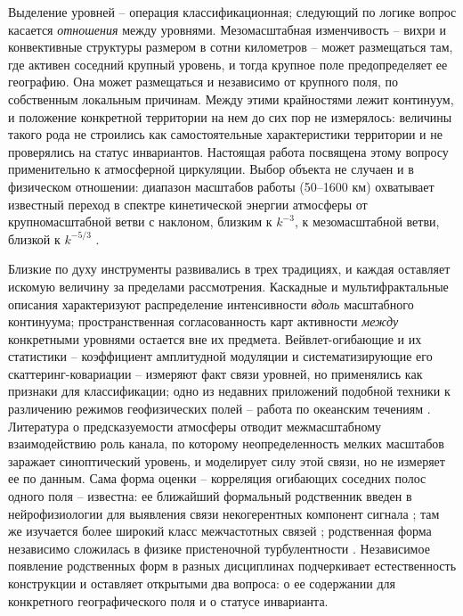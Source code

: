 \documentclass[12pt,a4paper]{article}
\begin{document}
Выделение уровней -- операция классификационная; следующий по логике вопрос касается \emph{отношения} между уровнями. Мезомасштабная изменчивость -- вихри и конвективные структуры размером в сотни километров -- может размещаться там, где активен соседний крупный уровень, и тогда крупное поле предопределяет ее географию. Она может размещаться и независимо от крупного поля, по собственным локальным причинам. Между этими крайностями лежит континуум, и положение конкретной территории на нем до сих пор не измерялось: величины такого рода не строились как самостоятельные характеристики территории и не проверялись на статус инвариантов. Настоящая работа посвящена этому вопросу применительно к атмосферной циркуляции. Выбор объекта не случаен и в физическом отношении: диапазон масштабов работы (50--1600 км) охватывает известный переход в спектре кинетической энергии атмосферы от крупномасштабной ветви с наклоном, близким к $k^{-3}$, к мезомасштабной ветви, близкой к $k^{-5/3}$ \cite{NastromGage1985}.

Близкие по духу инструменты развивались в трех традициях, и каждая оставляет искомую величину за пределами рассмотрения. Каскадные и мультифрактальные описания \cite{LovejoySchertzer2013,Lovejoy2011,Kouhen2024} характеризуют распределение интенсивности \emph{вдоль} масштабного континуума; пространственная согласованность карт активности \emph{между} конкретными уровнями остается вне их предмета. Вейвлет-огибающие и их статистики -- коэффициент амплитудной модуляции \cite{Farge1992,Mathis2009} и систематизирующие его скаттеринг-ковариации \cite{Mallat2012,BrunaMallat2013,Cheng2024} -- измеряют факт связи уровней, но применялись как признаки для классификации; одно из недавних приложений подобной техники к различению режимов геофизических полей -- работа по океанским течениям \cite{Skinner2025}. Литература о предсказуемости атмосферы \cite{Lorenz1969,Zhang2007,RotunnoSnyder2008,Judt2020,SelzCraig2023} отводит межмасштабному взаимодействию роль канала, по которому неопределенность мелких масштабов заражает синоптический уровень, и моделирует силу этой связи, но не измеряет ее по данным. Сама форма оценки -- корреляция огибающих соседних полос одного поля -- известна: ее ближайший формальный родственник введен в нейрофизиологии для выявления связи некогерентных компонент сигнала \cite{Bruns2000}; там же изучается более широкий класс межчастотных связей \cite{Canolty2006}; родственная форма независимо сложилась в физике пристеночной турбулентности \cite{Mathis2009}. Независимое появление родственных форм в разных дисциплинах подчеркивает естественность конструкции и оставляет открытыми два вопроса: о ее содержании для конкретного географического поля и о статусе инварианта.
\end{document}
